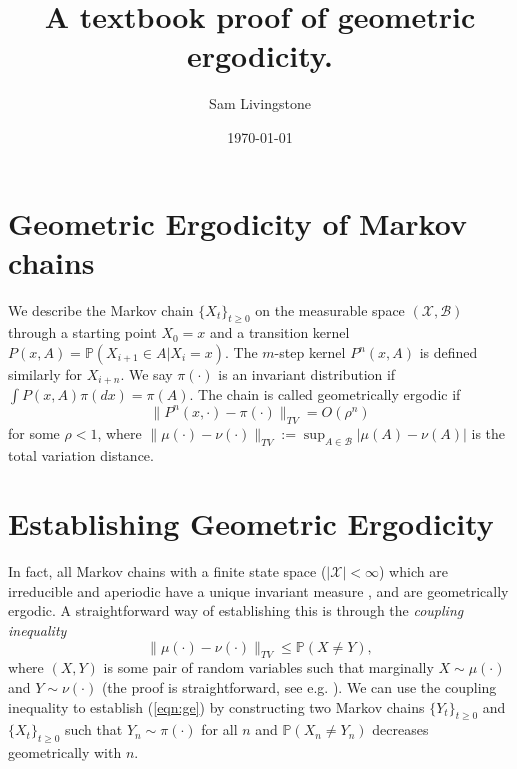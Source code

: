 \documentclass{article}
\title{\Large \bfseries A textbook proof of geometric ergodicity.}
\author{Sam Livingstone}
\date{\today}
\begin{document}
\maketitle

\section{Geometric Ergodicity of Markov chains}

We describe the Markov chain $\{ X_t \}_{t \geq 0}$ on the measurable space $(\mathcal{X},\mathcal{B})$ through a starting point $X_0 = x$ and a transition kernel $P(x,A) = \mathbb{P}(X_{i+1} \in A |X_i = x)$.  The $m$-step kernel $P^n(x,A)$ is defined similarly for $X_{i+n}$.  We say $\pi(\cdot)$ is an invariant distribution if $\int P(x,A)\pi(dx) = \pi(A)$.  The chain is called geometrically ergodic if
\begin{equation} \label{eqn:ge}
\| P^n(x,\cdot) - \pi(\cdot) \|_{TV} = O(\rho^n)
\end{equation}
for some $\rho < 1$, where $\|\mu(\cdot) - \nu(\cdot)\|_{TV} := \sup_{A \in \mathcal{B}} |\mu(A) - \nu(A)|$ is the total variation distance. 

\section{Establishing Geometric Ergodicity}

In fact, all Markov chains with a finite state space ($|\mathcal{X}| < \infty$) which are irreducible and aperiodic have a unique invariant measure \cite{Norris_1997}, and are geometrically ergodic.  A straightforward way of establishing this is through the \emph{coupling inequality}
\begin{equation}
\|\mu(\cdot) - \nu(\cdot)\|_{TV} \leq \mathbb{P}(X \neq Y),
\end{equation}
where $(X,Y)$ is some pair of random variables such that marginally $X \sim \mu(\cdot)$ and $Y \sim \nu(\cdot)$ (the proof is straightforward, see e.g. \cite{2004}).  We can use the coupling inequality to establish (\ref{eqn:ge}) by constructing two Markov chains $\{Y_t\}_{t \geq 0}$ and $\{ X_t\}_{t \geq 0}$ such that $Y_n \sim \pi(\cdot)$ for all $n$ and $\mathbb{P}(X_n \neq Y_n)$ decreases geometrically with $n$.
\end{document}
